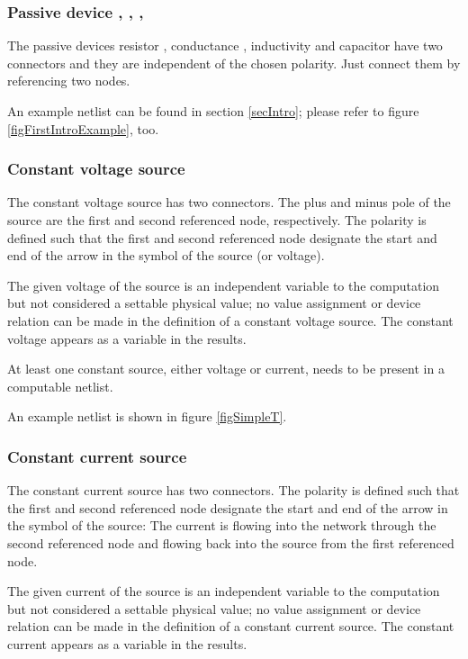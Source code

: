 

\subsubsection{Passive device , , , }

The passive devices resistor , conductance , inductivity
 and capacitor  have two connectors and they are
independent of the chosen polarity. Just connect them by referencing two
nodes.

An example netlist can be found in section \ref{secIntro}; please refer to figure
\ref{figFirstIntroExample}, too.


\subsubsection{Constant voltage source }

The constant voltage source  has two connectors. The plus and
minus pole of the source are the first and second referenced node,
respectively. The polarity is defined such that the first and second
referenced node designate the start and end of the arrow in the symbol of
the source (or voltage).

The given voltage of the source is an independent variable to the
computation but not considered a settable physical value; no value
assignment or device relation can be made in the definition of a constant
voltage source. The constant voltage appears as a variable in the
results.

At least one constant source, either voltage or current, needs to be
present in a computable netlist.

An example netlist is shown in figure \ref{figSimpleT}.


\subsubsection{Constant current source }

The constant current source  has two connectors. The polarity is
defined such that the first and second referenced node designate the start
and end of the arrow in the symbol of the source: The current is flowing
into the network through the second referenced node and flowing back into
the source from the first referenced node.

The given current of the source is an independent variable to the
computation but not considered a settable physical value; no value
assignment or device relation can be made in the definition of a constant
current source. The constant current appears as a variable in the results.

